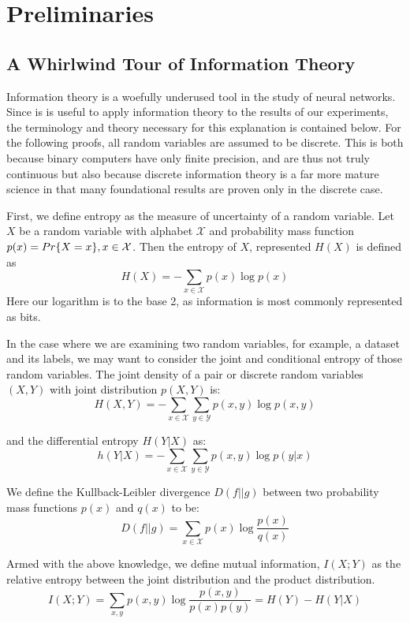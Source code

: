 \chapter{Preliminaries}
\label{chap:two}

\section{A Whirlwind Tour of Information Theory}
Information theory is a woefully underused tool in the study of neural networks. 
Since is is useful to apply information theory to the results of our experiments, the terminology and theory necessary for this explanation is contained below.
For the following proofs, all random variables are assumed to be discrete. 
This is both because binary computers have only finite precision, and are thus not truly continuous but also because discrete information theory is a far more mature science in that many foundational results are proven only in the discrete case.

First, we define entropy as the measure of uncertainty of a random variable.
Let $X$ be a random variable with alphabet $\mathcal{X}$ and probability mass function $p(x) = \\Pr\{X = x\}, x \in \mathcal{X}$.
Then the entropy of $X$, represented $H(X)$ is defined as
$$H(X) = -\sum_{x \in \mathcal{X}} p(x) \log{p(x)}$$
Here our logarithm is to the base 2, as information is most commonly represented as bits. 

In the case where we are examining two random variables, for example, a dataset and its labels, we may want to consider the joint and conditional entropy of those random variables.
The joint density of a pair or discrete random variables $(X, Y)$ with joint distribution $p(X, Y)$ is:
$$H(X, Y) = - \sum_{x \in \mathcal{X}} \sum_{y \in \mathcal{Y}} p(x, y) \log{p(x, y)}$$

and the differential entropy $H(Y | X)$ as:
$$ h(Y|X) = -\sum_{x \in \mathcal{X}} \sum_{y \in \mathcal{Y}} p(x, y) \log{p(y|x)}$$

We define the Kullback-Leibler divergence $D(f||g)$ between two probability mass functions $p(x)$ and $q(x)$ to be:
$$D(f||g) = \sum_{x \in \mathcal{X}} p(x) \log{\frac{p(x)}{q(x)}}$$

Armed with the above knowledge, we define mutual information, $I(X; Y)$ as the relative entropy between the joint distribution and the product distribution.
$$I(X; Y) = \sum_{x, y} p(x, y) \log{\frac{p(x,y)}{p(x) p(y)}} = H(Y) - H(Y|X)$$


